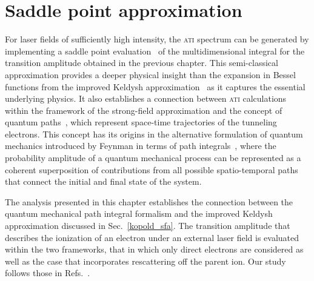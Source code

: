 \chapter{Saddle point approximation}
\label{cha:sp_approx}



For laser fields of sufficiently high intensity, the \textsc{ati}
spectrum can be generated by implementing a saddle point
evaluation~\cite{LewensteinSPA_1994} of the multidimensional integral
for the transition amplitude obtained in the previous chapter. This
semi-classical approximation provides a deeper physical insight than
the expansion in Bessel functions from the improved Keldysh
approximation~\cite{Kopold_1997sfa} as it captures the essential
underlying physics. It also establishes a connection between
\textsc{ati} calculations within the framework of the strong-field
approximation and the concept of quantum
paths~\cite{KopoldOptComm2000}, which represent space-time
trajectories of the tunneling electrons. This concept has its origins
in the alternative formulation of quantum mechanics introduced by
Feynman in terms of path integrals~\cite{RevModPhysFeynman}, where the
probability amplitude of a quantum mechanical process can be
represented as a coherent superposition of contributions from all
possible spatio-temporal paths that connect the initial and final
state of the system.

The analysis presented in this chapter establishes the connection
between the quantum mechanical path integral formalism and the
improved Keldysh approximation discussed in Sec.~\ref{kopold_sfa}. The
transition amplitude that describes the ionization of an electron
under an external laser field is evaluated within the two frameworks,
that in which only direct electrons are considered as well as the case
that incorporates rescattering off the parent ion. Our study follows
those in Refs.~\cite{Kopold_1997sfa, KopoldOptComm2000}.

